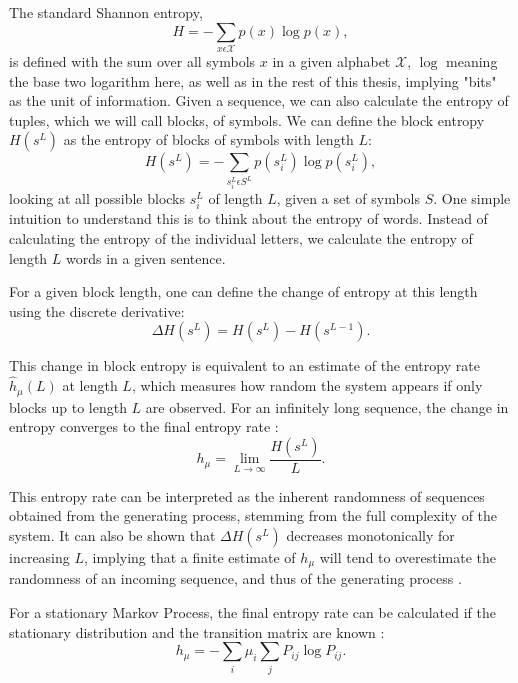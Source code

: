 \documentclass[12pt,a4paper]{article}
\begin{document}
The standard Shannon entropy,
\begin{equation}
    \label{eq:shannon_entropy}
    H = -\sum_{x \epsilon \mathcal{X}} p(x) \log p(x),
\end{equation}
is defined with the sum over all symbols $x$ in a given alphabet $\mathcal{X}$, $\log$ meaning the base two logarithm here, as well as in the rest of this thesis, implying "bits" as the unit of information.
Given a sequence, we can also calculate the entropy of tuples, which we will call blocks, of symbols.
We can define the block entropy $H(s^L)$ as the entropy of blocks of symbols with length $L$:
\begin{equation}
    \label{eq:block_entropy}
    H(s^L) = -\sum_{s_i^L \epsilon S^L} p(s_i^L) \log p(s_i^L),
\end{equation}
looking at all possible blocks $s_i^L$ of length $L$, given a set of symbols $S$.
One simple intuition to understand this is to think about the entropy of words.
Instead of calculating the entropy of the individual letters, we calculate the entropy of length $L$ words in a given sentence.

For a given block length, one can define the change of entropy at this length using the discrete derivative:
\begin{equation}
    \label{eq:entropy_change}
    \Delta H(s^L) = H(s^L) - H(s^{L-1}).
\end{equation}

This change in block entropy is equivalent to an estimate of the entropy rate $\hat{h}_\mu(L)$ at length $L$, which measures how random the system appears if only blocks up to length $L$ are observed.
For an infinitely long sequence, the change in entropy converges to the final entropy rate \autocite{crutchfield2003regularities}:
\begin{equation}
    \label{eq:entropy_rate_limit}
    h_\mu = \lim_{L \to \infty} \frac{H(s^L)}{L}.
\end{equation}

This entropy rate can be interpreted as the inherent randomness of sequences obtained from the generating process, stemming from the full complexity of the system.
It can also be shown that $\Delta H(s^L)$ decreases monotonically for increasing $L$, implying that a finite estimate of $h_\mu$ will tend to overestimate the randomness of an incoming sequence, and thus of the generating process \autocite{crutchfield2003regularities}.

For a stationary Markov Process, the final entropy rate can be calculated if the stationary distribution and the transition matrix are known \autocite{cover1999elements}:
\begin{equation}
    \label{eq:entropy_rate_MP}
    h_\mu = -\sum_i \mu_i \sum_j P_{ij} \log P_{ij}.
\end{equation}
\end{document}
